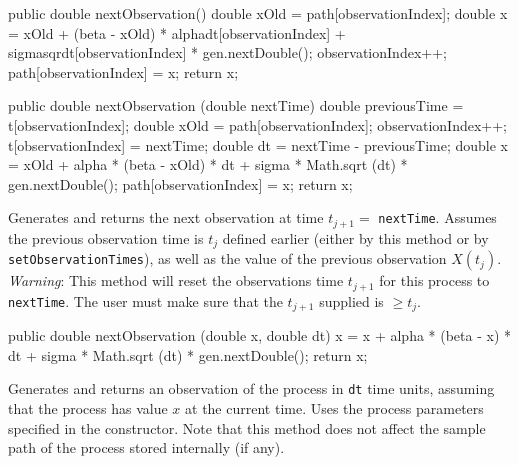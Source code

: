 \begin{hide}\begin{code}

   public double nextObservation() {
      double xOld = path[observationIndex];
      double x = xOld + (beta - xOld) * alphadt[observationIndex]
                 + sigmasqrdt[observationIndex] * gen.nextDouble();
      observationIndex++;
      path[observationIndex] = x;
      return x;
   }

   public double nextObservation (double nextTime) {
      double previousTime = t[observationIndex];
      double xOld = path[observationIndex];
      observationIndex++;
      t[observationIndex] = nextTime;
      double dt = nextTime - previousTime;
      double x = xOld + alpha * (beta - xOld) * dt
           + sigma * Math.sqrt (dt) * gen.nextDouble();
      path[observationIndex] = x;
      return x;
   }
\end{code}
\begin{tabb} Generates and returns the next observation at time $t_{j+1} =$
 \texttt{nextTime}. Assumes the previous observation time is $t_{j}$ defined 
earlier (either by this method or by \texttt{setObservationTimes}), 
as well as the value of the previous observation $X(t_j)$. 
\emph{Warning}: This method will reset the observations time $t_{j+1}$
for this process to \texttt{nextTime}. The user must make sure that
the $t_{j+1}$ supplied is $\geq t_{j}$.
\end{tabb}
\begin{code}

   public double nextObservation (double x, double dt) {
      x = x + alpha * (beta - x) * dt
            + sigma * Math.sqrt (dt) * gen.nextDouble();
      return x;
    }
\end{code}
\begin{tabb} Generates and returns an observation of the process 
in \texttt{dt} time units,
assuming that the process has value $x$ at the current time.
Uses the process parameters specified in the constructor.
Note that this method does not affect the sample path of the process 
stored internally (if any).
\end{tabb}
\begin{code}


\end{code}
\end{hide}
